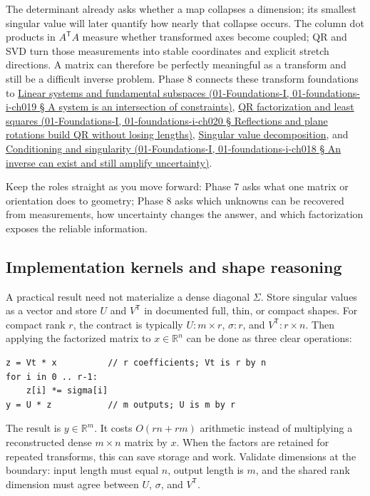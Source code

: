 The determinant already asks whether a map collapses a dimension; its smallest singular value will later quantify how nearly that collapse occurs. The column dot products in \(A^\mathsf T A\) measure whether transformed axes become coupled; QR and SVD turn those measurements into stable coordinates and explicit stretch directions. A matrix can therefore be perfectly meaningful as a transform and still be a difficult inverse problem. Phase 8 connects these transform foundations to \href{}{Linear systems and fundamental subspaces (01-Foundations-I, 01-foundations-i-ch019 § A system is an intersection of constraints)}, \href{}{QR factorization and least squares (01-Foundations-I, 01-foundations-i-ch020 § Reflections and plane rotations build QR without losing lengths)}, \hyperref[02-foundations-ii-ch024]{Singular value decomposition}, and \href{}{Conditioning and singularity (01-Foundations-I, 01-foundations-i-ch018 § An inverse can exist and still amplify uncertainty)}.

Keep the roles straight as you move forward: Phase 7 asks what one matrix or orientation does to geometry; Phase 8 asks which unknowns can be recovered from measurements, how uncertainty changes the answer, and which factorization exposes the reliable information.

\subsection{Implementation kernels and shape reasoning}\label{implementation-kernels-and-shape-reasoning}

A practical result need not materialize a dense diagonal \(\Sigma\). Store singular values as a vector and store \(U\) and \(V^\mathsf T\) in documented full, thin, or compact shapes. For compact rank \(r\), the contract is typically \(U:m\times r\), \(\sigma:r\), and \(V^\mathsf T:r\times n\). Then applying the factorized matrix to \(x\in\mathbb R^n\) can be done as three clear operations:

\begin{verbatim}
z = Vt * x          // r coefficients; Vt is r by n
for i in 0 .. r-1:
    z[i] *= sigma[i]
y = U * z           // m outputs; U is m by r
\end{verbatim}

The result is \(y\in\mathbb R^m\). It costs \(O(rn+rm)\) arithmetic instead of multiplying a reconstructed dense \(m\times n\) matrix by \(x\). When the factors are retained for repeated transforms, this can save storage and work. Validate dimensions at the boundary: input length must equal \(n\), output length is \(m\), and the shared rank dimension must agree between \(U\), \(\sigma\), and \(V^\mathsf T\).

